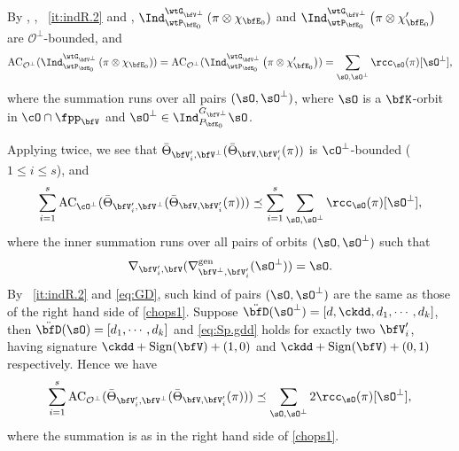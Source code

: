 \documentclass[12pt,a4paper]{amsart}
\newcommand{\AC}{\mathrm{AC}}
\newcommand{\CO}{{\mathcal {O}}}
\newcommand{\p}{\mathfrak p}
\def\DD{\nabla}
\def\gDD{\nabla^{\mathrm{gen}}}
\numberwithin{equation}{section}
\theoremstyle{remark}
\def\abfV{\bfV'}
\def\Thetab{\bar{\Theta}}
\def\KV{\bfK_{\bfV}}
\def\KV{\bfK}
\def\sOpe{\sO^\perp}
\def\bfVpe{\bfV^\perp}
\def\ssD{\ddot{\bfD}}
\begin{document}
By , , ~\ref{it:indR.2} and \cite[Theorem~1.4]{SV},
 $\Ind_{\wtP_{\bfE_0}}^{\wtG_{\bfVpe}} \left(\pi\otimes \chi_{\bfE_0}\right)$ and
  $\Ind_{\wtP_{\bfE_0}}^{\wtG_{\bfVpe}} \left(\pi\otimes \chi'_{\bfE_0}\right)$ are
$\CO^\perp$-bounded, and
  \begin{equation}
    \label{chops1}
    \AC_{\CO^\perp}(\Ind_{\wtP_{\bfE_0}}^{\wtG_{\bfVpe}} \left(\pi\otimes
      \chi_{\bfE_0}\right))
    =\AC_{\CO^\perp}(\Ind_{\wtP_{\bfE_0}}^{\wtG_{\bfV^\perp}}
    \left(\pi\otimes \chi'_{\bfE_0}\right))
    =\sum_{\sO, \sOpe}  \rcc_\sO(\pi) [\sO^\perp ],
  \end{equation}
  where the summation runs over all pairs $(\sO,\sOpe)$, where $\sO$ is a
  $\KV$-orbit in $\cO\cap \fpp_{\bfV}$ and $\sOpe\in \Ind_{P_{\bfE_0}}^{G_{\bfVpe}}\sO$.


  Applying  twice, %
    we see that $\Thetab_{\abfV_i,\bfV^\perp}(\Thetab_{\bfV,\abfV_i}(\pi))$ is
  $\cO^\perp$-bounded ($1\leq i\leq s$), and
\[
  \sum_{i=1}^s
  \AC_{\cO^\perp}(\Thetab_{\abfV_i,\bfVpe}(\Thetab_{\bfV,\abfV_i}(\pi)))\preceq\sum_{i=1}^s
  \sum_{\sO,\sOpe} \rcc_\sO(\pi) [\sO^\perp ],
\]
where the inner summation runs over all pairs of orbits $(\sO,\sOpe)$ such that
\begin{equation}\label{eq:Sp.gdd}
\DD_{\bfV_i', \bfV}(\gDD_{\bfVpe,\abfV_i}(\sOpe)) = \sO.
\end{equation}
By ~\ref{it:indR.2} and \cref{eq:GD}, such kind of
pairs $(\sO,\sOpe)$ are the same as those of the right hand side of
\eqref{chops1}. Suppose $\ssD(\sOpe) = [d,\ckdd,d_1,\cdots, d_k]$, then
$\ssD(\sO) = [d_1,\cdots, d_k]$ and \cref{eq:Sp.gdd} holds
for exactly two $\abfV_i$, having signature $\ckdd+\sign{\bfV}+(1,0)$ and
$\ckdd+\sign{\bfV}+(0,1)$ respectively. Hence we have
\begin{equation}
  \label{chops2}
  \sum_{i=1}^s \AC_{\CO^\perp}(\Thetab_{\abfV_i,\bfV^\perp}(\Thetab_{\bfV,\abfV_i}(\pi)))\preceq \sum_{\sO, \sO^\perp}
  2\rcc_\sO(\pi) [\sO^\perp ],
\end{equation}
where the summation is as in the right hand
side of \eqref{chops1}.
\end{document}
